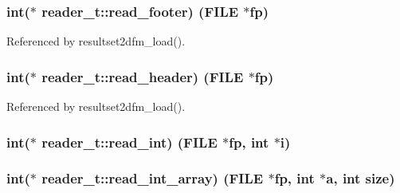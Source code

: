 \subsubsection[{\texorpdfstring{read\+\_\+footer}{read_footer}}]{\setlength{\rightskip}{0pt plus 5cm}int($\ast$ reader\+\_\+t\+::read\+\_\+footer) (F\+I\+LE $\ast$fp)}\hypertarget{structreader__t_a675b82ce610a031d955bac348e95079f}{}\label{structreader__t_a675b82ce610a031d955bac348e95079f}


Referenced by resultset2dfm\+\_\+load().

\subsubsection[{\texorpdfstring{read\+\_\+header}{read_header}}]{\setlength{\rightskip}{0pt plus 5cm}int($\ast$ reader\+\_\+t\+::read\+\_\+header) (F\+I\+LE $\ast$fp)}\hypertarget{structreader__t_a8540a7b02115132e1d63ef34b88bfca5}{}\label{structreader__t_a8540a7b02115132e1d63ef34b88bfca5}


Referenced by resultset2dfm\+\_\+load().

\subsubsection[{\texorpdfstring{read\+\_\+int}{read_int}}]{\setlength{\rightskip}{0pt plus 5cm}int($\ast$ reader\+\_\+t\+::read\+\_\+int) (F\+I\+LE $\ast$fp, int $\ast$i)}\hypertarget{structreader__t_a819d0f0a0d588e8c9ce9e09d83f48c3a}{}\label{structreader__t_a819d0f0a0d588e8c9ce9e09d83f48c3a}
\subsubsection[{\texorpdfstring{read\+\_\+int\+\_\+array}{read_int_array}}]{\setlength{\rightskip}{0pt plus 5cm}int($\ast$ reader\+\_\+t\+::read\+\_\+int\+\_\+array) (F\+I\+LE $\ast$fp, int $\ast$a, int size)}\hypertarget{structreader__t_a760b7eaa6a0ee7b9f58747764e382112}{}\label{structreader__t_a760b7eaa6a0ee7b9f58747764e382112}
